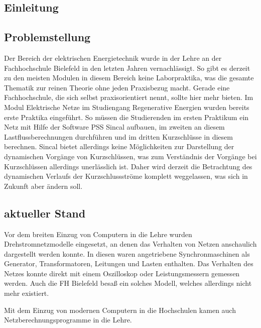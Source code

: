 \documentclass{scrartcl}
\begin{document}
	\newpage
	\setcounter{page}{1}
\begin{onehalfspace}

\section{Einleitung}
\subsection{Problemstellung}
Der Bereich der elektrischen Energietechnik wurde in der Lehre an der Fachhochschule Bielefeld in den letzten Jahren vernachlässigt. So gibt es derzeit zu den meisten Modulen in diesem Bereich keine Laborpraktika, was die gesamte Thematik zur reinen Theorie ohne jeden Praxisbezug macht. Gerade eine Fachhochschule, die sich selbst praxisorientiert nennt, sollte hier mehr bieten. Im Modul \glqq Elektrische Netze\grqq{} im Studiengang Regenerative Energien wurden bereits erste Praktika eingeführt. So müssen die Studierenden im ersten Praktikum ein Netz mit Hilfe der Software PSS Sincal aufbauen, im zweiten an diesem Lastflussberechnungen durchführen und im dritten Kurzschlüsse in diesem berechnen. Sincal bietet allerdings keine Möglichkeiten zur Darstellung der dynamischen Vorgänge von Kurzschlüssen, was zum Verständnis der Vorgänge bei Kurzschlüssen allerdings unerlässlich ist. Daher wird derzeit die Betrachtung des dynamischen Verlaufs der Kurzschlussströme komplett weggelassen, was sich in Zukunft aber ändern soll.

\subsection{aktueller Stand}
Vor dem breiten Einzug von Computern in die Lehre wurden Drehstromnetzmodelle eingesetzt, an denen das Verhalten von Netzen anschaulich dargestellt werden konnte. In diesen waren angetriebene Synchronmaschinen als Generator, Transformatoren, Leitungen und Lasten enthalten. Das Verhalten des Netzes konnte direkt mit einem Oszilloskop oder Leistungsmessern gemessen werden. Auch die FH Bielefeld besaß ein solches Modell, welches allerdings nicht mehr existiert.

Mit dem Einzug von modernen Computern in die Hochschulen kamen auch Netzberechnungsprogramme in die Lehre.


\end{onehalfspace}
\end{document}
